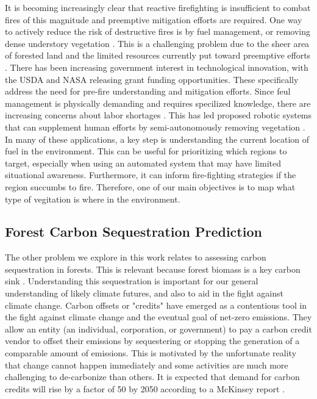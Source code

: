 It is becoming increasingly clear that reactive firefighting is insufficient to combat fires of this magnitude and preemptive mitigation efforts are required. One way to actively reduce the risk of destructive fires is by fuel management, or removing dense understory vegetation \cite{Fire2021FuelsManagement, WildlandFireResiliencyProgram20214Plan, Agriculture2019HazardousComplex}. This is a challenging problem due to the sheer area of forested land and the limited resources currently put toward preemptive efforts \cite{spreading_like_wildfire}.
There has been increasing government interest in technological innovation, with the USDA \cite{USDA2023USDAGrant} and NASA \cite{SPSO2023Research2023} releasing grant funding opportunities. These specifically address the need for pre-fire understanding and mitigation efforts. 
Since feul management is physically demanding and requires specilized knowledge, there are increasing concerns about labor shortages \cite{CommisionGlobalDivision}. This has led proposed robotic systems that can supplement human efforts by semi-autonomously removing vegetation \cite{couceiro2019semfire}. In many of these applications, a key step is understanding the current location of fuel in the environment. This can be useful for prioritizing which regions to target, especially when using an automated system that may have limited situational awareness. Furthermore, it can inform fire-fighting strategies if the region succumbs to fire. Therefore, one of our main objectives is to map what type of vegitation is where in the environment.

\subsection{Forest Carbon Sequestration Prediction}
The other problem we explore in this work relates to assessing carbon sequestration in forests. This is relevant because forest biomass is a key carbon sink \cite{Griscom2017NaturalSolutions}. Understanding this sequestration is important for our general understanding of likely climate futures, and also to aid in the fight against climate change. Carbon offsets or "credits" have emerged as a contentious tool in the fight against climate change and the eventual goal of net-zero emissions. They allow an entity (an individual, corporation, or government) to pay a carbon credit vendor to offset their emissions by sequestering or stopping the generation of a comparable amount of emissions. This is motivated by the unfortunate reality that change cannot happen immediately and some activities are much more challenging to de-carbonize than others. It is expected that demand for carbon credits will rise by a factor of 50 by 2050 according to a McKinsey report \cite{Blaufelder2021AChallenge}. 

